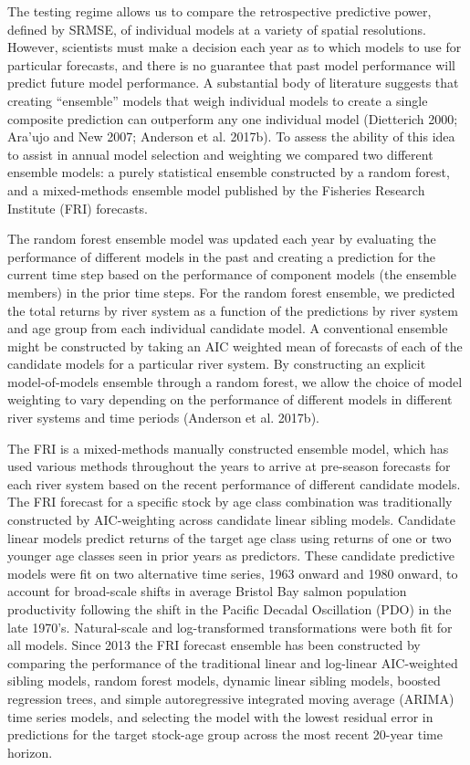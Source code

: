 \documentclass[
]{article}
\begin{document}
The testing regime allows us to compare the retrospective predictive power, defined by SRMSE, of individual models at a variety of spatial resolutions. However, scientists must make a decision each year as to which models to use for particular forecasts, and there is no guarantee that past model performance will predict future model performance. A substantial body of literature suggests that creating ``ensemble'' models that weigh individual models to create a single composite prediction can outperform any one individual model (Dietterich 2000; Ara'ujo and New 2007; Anderson et al. 2017b). To assess the ability of this idea to assist in annual model selection and weighting we compared two different ensemble models: a purely statistical ensemble constructed by a random forest, and a mixed-methods ensemble model published by the Fisheries Research Institute (FRI) forecasts.

The random forest ensemble model was updated each year by evaluating the performance of different models in the past and creating a prediction for the current time step based on the performance of component models (the ensemble members) in the prior time steps. For the random forest ensemble, we predicted the total returns by river system as a function of the predictions by river system and age group from each individual candidate model. A conventional ensemble might be constructed by taking an AIC weighted mean of forecasts of each of the candidate models for a particular river system. By constructing an explicit model-of-models ensemble through a random forest, we allow the choice of model weighting to vary depending on the performance of different models in different river systems and time periods (Anderson et al. 2017b).

The FRI is a mixed-methods manually constructed ensemble model, which has used various methods throughout the years to arrive at pre-season forecasts for each river system based on the recent performance of different candidate models. The FRI forecast for a specific stock by age class combination was traditionally constructed by AIC-weighting across candidate linear sibling models. Candidate linear models predict returns of the target age class using returns of one or two younger age classes seen in prior years as predictors. These candidate predictive models were fit on two alternative time series, 1963 onward and 1980 onward, to account for broad-scale shifts in average Bristol Bay salmon population productivity following the shift in the Pacific Decadal Oscillation (PDO) in the late 1970's. Natural-scale and log-transformed transformations were both fit for all models. Since 2013 the FRI forecast ensemble has been constructed by comparing the performance of the traditional linear and log-linear AIC-weighted sibling models, random forest models, dynamic linear sibling models, boosted regression trees, and simple autoregressive integrated moving average (ARIMA) time series models, and selecting the model with the lowest residual error in predictions for the target stock-age group across the most recent 20-year time horizon.
\end{document}
